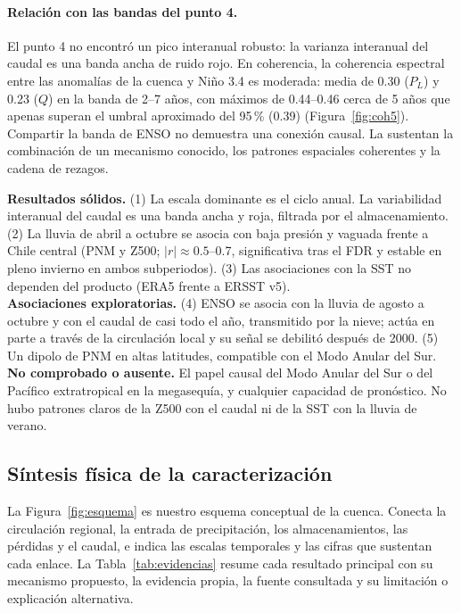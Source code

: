 \documentclass[11pt,a4paper]{article}
\newcommand{\PL}{P_L}
\newcommand{\Qm}{Q}
\begin{document}
\paragraph{Relación con las bandas del punto 4.} El punto 4 no encontró un pico interanual robusto: la varianza interanual del caudal es una banda ancha de ruido rojo. En coherencia, la coherencia espectral entre las anomalías de la cuenca y Niño 3.4 es moderada: media de 0.30 ($\PL$) y 0.23 ($\Qm$) en la banda de 2--7 años, con máximos de 0.44--0.46 cerca de 5 años que apenas superan el umbral aproximado del 95\,\% (0.39) (Figura~\ref{fig:coh5}). Compartir la banda de ENSO no demuestra una conexión causal. La sustentan la combinación de un mecanismo conocido, los patrones espaciales coherentes y la cadena de rezagos.

\begin{purplebox}[title={Síntesis de los puntos 4 y 5}]
\textbf{Resultados sólidos.} (1) La escala dominante es el ciclo anual. La variabilidad interanual del caudal es una banda ancha y roja, filtrada por el almacenamiento. (2) La lluvia de abril a octubre se asocia con baja presión y vaguada frente a Chile central (PNM y Z500; $|r|\approx0.5$--0.7, significativa tras el FDR y estable en pleno invierno en ambos subperiodos). (3) Las asociaciones con la SST no dependen del producto (ERA5 frente a ERSST v5).\\[2pt]
\textbf{Asociaciones exploratorias.} (4) ENSO se asocia con la lluvia de agosto a octubre y con el caudal de casi todo el año, transmitido por la nieve; actúa en parte a través de la circulación local y su señal se debilitó después de 2000. (5) Un dipolo de PNM en altas latitudes, compatible con el Modo Anular del Sur.\\[2pt]
\textbf{No comprobado o ausente.} El papel causal del Modo Anular del Sur o del Pacífico extratropical en la megasequía, y cualquier capacidad de pronóstico. No hubo patrones claros de la Z500 con el caudal ni de la SST con la lluvia de verano.
\end{purplebox}
\subsection{Síntesis física de la caracterización}
\label{sec:sintesis}

La Figura~\ref{fig:esquema} es nuestro esquema conceptual de la cuenca. Conecta la circulación regional, la entrada de precipitación, los almacenamientos, las pérdidas y el caudal, e indica las escalas temporales y las cifras que sustentan cada enlace. La Tabla~\ref{tab:evidencias} resume cada resultado principal con su mecanismo propuesto, la evidencia propia, la fuente consultada y su limitación o explicación alternativa.
\end{document}
